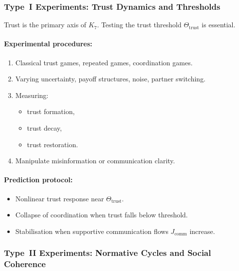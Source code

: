 \subsubsection{Type~I Experiments: Trust Dynamics and Thresholds}

Trust is the primary axis of $K_7$.  
Testing the trust threshold $\Theta_{\mathrm{trust}}$ is essential.

\paragraph{Experimental procedures:}

\begin{enumerate}
    \item Classical trust games, repeated games, coordination games.
    \item Varying uncertainty, payoff structures, noise, partner switching.
    \item Measuring:
          \begin{itemize}
              \item trust formation,
              \item trust decay,
              \item trust restoration.
          \end{itemize}
    \item Manipulate misinformation or communication clarity.
\end{enumerate}

\paragraph{Prediction protocol:}

\begin{itemize}
    \item Nonlinear trust response near 
          $\Theta_{\mathrm{trust}}$.
    \item Collapse of coordination when trust falls below threshold.
    \item Stabilisation when supportive communication flows $J_{\mathrm{comm}}$ increase.
\end{itemize}



\subsubsection{Type~II Experiments: Normative Cycles and Social Coherence}

